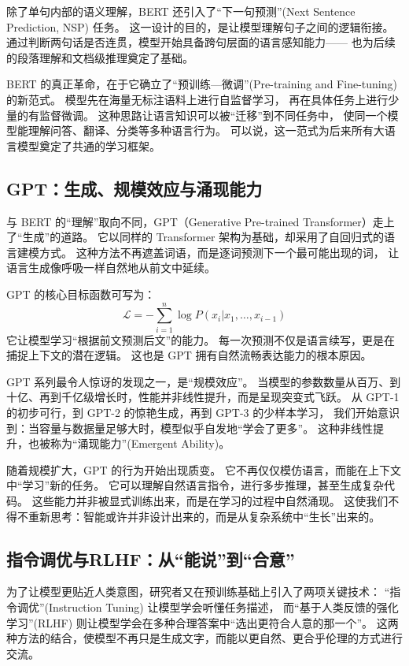 除了单句内部的语义理解，BERT 还引入了“下一句预测”(Next Sentence Prediction, NSP) 任务。  
这一设计的目的，是让模型理解句子之间的逻辑衔接。  
通过判断两句话是否连贯，模型开始具备跨句层面的语言感知能力——  
也为后续的段落理解和文档级推理奠定了基础。  

BERT 的真正革命，在于它确立了“预训练—微调”(Pre-training and Fine-tuning) 的新范式。  
模型先在海量无标注语料上进行自监督学习，  
再在具体任务上进行少量的有监督微调。  
这种思路让语言知识可以被“迁移”到不同任务中，  
使同一个模型能理解问答、翻译、分类等多种语言行为。  
可以说，这一范式为后来所有大语言模型奠定了共通的学习框架。  

\subsection{GPT：生成、规模效应与涌现能力}

与 BERT 的“理解”取向不同，GPT（Generative Pre-trained Transformer）走上了“生成”的道路。  
它以同样的 Transformer 架构为基础，却采用了自回归式的语言建模方式。  
这种方法不再遮盖词语，而是逐词预测下一个最可能出现的词，  
让语言生成像呼吸一样自然地从前文中延续。  

GPT 的核心目标函数可写为：  
\[
\mathcal{L} = -\sum_{i=1}^n \log P(x_i | x_1, \ldots, x_{i-1})
\]  
它让模型学习“根据前文预测后文”的能力。  
每一次预测不仅是语言续写，更是在捕捉上下文的潜在逻辑。  
这也是 GPT 拥有自然流畅表达能力的根本原因。  

GPT 系列最令人惊讶的发现之一，是“规模效应”。  
当模型的参数数量从百万、到十亿、再到千亿级增长时，性能并非线性提升，而是呈现突变式飞跃。  
从 GPT-1 的初步可行，到 GPT-2 的惊艳生成，再到 GPT-3 的少样本学习，  
我们开始意识到：当容量与数据量足够大时，模型似乎自发地“学会了更多”。  
这种非线性提升，也被称为“涌现能力”(Emergent Ability)。  

随着规模扩大，GPT 的行为开始出现质变。  
它不再仅仅模仿语言，而能在上下文中“学习”新的任务。  
它可以理解自然语言指令，进行多步推理，甚至生成复杂代码。  
这些能力并非被显式训练出来，而是在学习的过程中自然涌现。  
这使我们不得不重新思考：智能或许并非设计出来的，而是从复杂系统中“生长”出来的。  

\subsection{指令调优与RLHF：从“能说”到“合意”}

为了让模型更贴近人类意图，研究者又在预训练基础上引入了两项关键技术：  
“指令调优”(Instruction Tuning) 让模型学会听懂任务描述，  
而“基于人类反馈的强化学习”(RLHF) 则让模型学会在多种合理答案中“选出更符合人意的那一个”。  
这两种方法的结合，使模型不再只是生成文字，而能以更自然、更合乎伦理的方式进行交流。  

